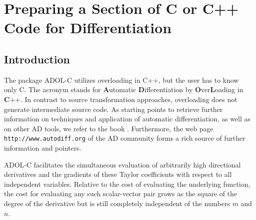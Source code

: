 \documentclass[11pt,twoside]{article}
\begin{document}
\newpage
%
%
\section{Preparing a Section of C or C++ Code for Differentiation}
\label{prepar}
%
\subsection{Introduction}
%
\setcounter{equation}{0}
The package \mbox{ADOL-C} 
utilizes overloading in C++, but the
user has to know only C. The acronym stands for {\bf A}utomatic 
{\bf D}ifferentiation by {\bf O}ver{\bf L}oading in {\bf C}++.
In contrast to source transformation approaches, overloading does not generate intermediate
source code. 
As starting points to retrieve further information on techniques and
application of automatic differentiation, as well as on other AD
tools, we refer to the book \cite{GrWa08}. Furthermore, the web page
\verb=http://www.autodiff.org= of the AD community forms a rich source
of further information and pointers.


ADOL-C facilitates the simultaneous
evaluation of arbitrarily high directional derivatives and the
gradients of these Taylor coefficients with respect to all independent
variables. Relative to the cost of evaluating the underlying function, 
the cost for evaluating any such scalar-vector pair grows as the
square of the degree of the derivative but is still completely
independent of the numbers $m$ and $n$. 
\end{document}
